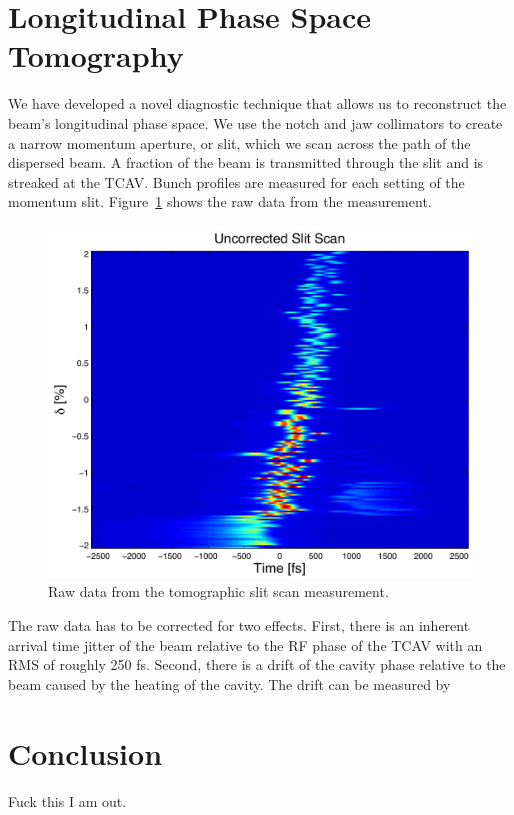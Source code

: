 \section{Longitudinal Phase Space Tomography}
We have developed a novel diagnostic technique that allows us to reconstruct the beam's longitudinal phase space. We use the notch and jaw collimators to create a narrow momentum aperture, or slit, which we scan across the path of the dispersed beam. A fraction of the beam is transmitted through the slit and is streaked at the TCAV. Bunch profiles are measured for each setting of the momentum slit. Figure~\ref{raw_data} shows the raw data from the measurement.

\begin{figure}[hbt]
  \includegraphics[width=\columnwidth]{figures/uncor.pdf}
  \caption{Raw data from the tomographic slit scan measurement.}
  \label{raw_data}
\end{figure}

The raw data has to be corrected for two effects. First, there is an inherent arrival time jitter of the beam relative to the RF phase of the TCAV with an RMS of roughly 250 fs. Second, there is a drift of the cavity phase relative to the beam caused by the heating of the cavity. The drift can be measured by 

\section{Conclusion}
Fuck this I am out.